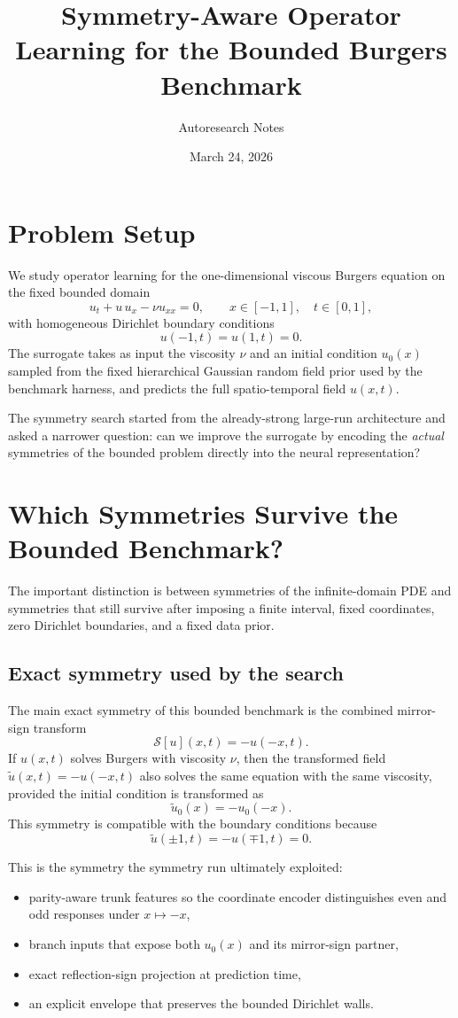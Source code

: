 \documentclass[11pt]{article}
\title{Symmetry-Aware Operator Learning for the Bounded Burgers Benchmark}
\author{Autoresearch Notes}
\date{March 24, 2026}
\begin{document}
\maketitle

\section{Problem Setup}
We study operator learning for the one-dimensional viscous Burgers equation on the fixed bounded domain
\[
u_t + u\,u_x - \nu u_{xx} = 0,
\qquad x \in [-1,1], \quad t \in [0,1],
\]
with homogeneous Dirichlet boundary conditions
\[
u(-1,t)=u(1,t)=0.
\]
The surrogate takes as input the viscosity $\nu$ and an initial condition $u_0(x)$ sampled from the fixed hierarchical Gaussian random field prior used by the benchmark harness, and predicts the full spatio-temporal field $u(x,t)$.

The symmetry search started from the already-strong large-run architecture and asked a narrower question: can we improve the surrogate by encoding the \emph{actual} symmetries of the bounded problem directly into the neural representation?

\section{Which Symmetries Survive the Bounded Benchmark?}
The important distinction is between symmetries of the infinite-domain PDE and symmetries that still survive after imposing a finite interval, fixed coordinates, zero Dirichlet boundaries, and a fixed data prior.

\subsection{Exact symmetry used by the search}
The main exact symmetry of this bounded benchmark is the combined mirror-sign transform
\[
\mathcal{S}[u](x,t) = -u(-x,t).
\]
If $u(x,t)$ solves Burgers with viscosity $\nu$, then the transformed field $\tilde u(x,t)=-u(-x,t)$ also solves the same equation with the same viscosity, provided the initial condition is transformed as
\[
\tilde u_0(x) = -u_0(-x).
\]
This symmetry is compatible with the boundary conditions because
\[
\tilde u(\pm 1,t) = -u(\mp 1,t)=0.
\]

This is the symmetry the symmetry run ultimately exploited:
\begin{itemize}[leftmargin=1.5em]
\item parity-aware trunk features so the coordinate encoder distinguishes even and odd responses under $x \mapsto -x$,
\item branch inputs that expose both $u_0(x)$ and its mirror-sign partner,
\item exact reflection-sign projection at prediction time,
\item an explicit envelope that preserves the bounded Dirichlet walls.
\end{itemize}
\end{document}

